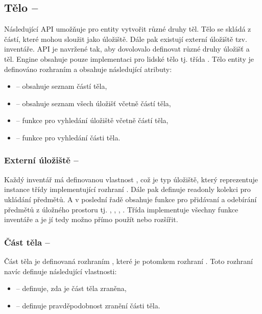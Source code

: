 \subsection{Tělo -- }

Následující API umožňuje pro entity vytvořit různé druhy těl.
Tělo se skládá z částí, které mohou sloužit jako úložiště. Dále pak existují externí
úložiště tzv. inventáře. API je navržené tak, aby dovolovalo definovat různé druhy úložišť a těl. 
Engine obsahuje pouze implementaci pro lidské tělo tj. třída .
Tělo entity je definováno rozhraním  a obsahuje následující atributy:

\begin{itemize}
\item {} -- obsahuje seznam částí těla,
\item {} -- obsahuje seznam všech úložišť včetně částí těla,
\item {} -- funkce pro vyhledání úložiště včetně částí těla,
\item {} -- funkce pro vyhledání části těla. 
\end{itemize}

\subsubsection{Externí úložiště -- }
Každý inventář má definovanou vlastnost , což je typ úložiště, který reprezentuje instance třídy 
implementující rozhraní . Dále pak definuje readonly kolekci  pro ukládání předmětů.
A v poslední řadě obsahuje funkce pro přidávaní a odebírání předmětů z úložného prostoru tj. , , ,
. Třída  implementuje všechny funkce inventáře a je jí tedy možno přímo použít nebo rozšířit.

\subsubsection{Část těla -- }
Část těla je definovaná rozhraním , které je potomkem rozhraní . Toto rozhraní navíc definuje 
následující vlastnosti: 
\begin{itemize}
\item {} -- definuje, zda je část těla zraněna,
\item {} -- definuje pravděpodobnost zranění části těla.
\end{itemize}

